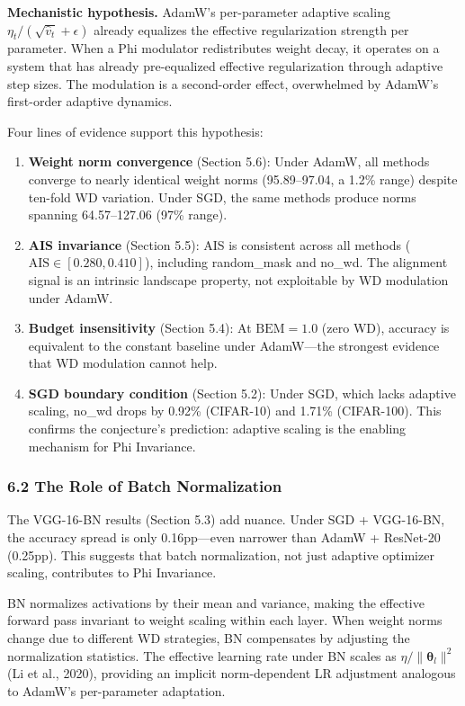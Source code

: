 \documentclass[
]{article}
\begin{document}
\textbf{Mechanistic hypothesis.} AdamW's per-parameter adaptive scaling
\(\eta_t / (\sqrt{\hat{v}_t} + \epsilon)\) already equalizes the
effective regularization strength per parameter. When a Phi modulator
redistributes weight decay, it operates on a system that has already
pre-equalized effective regularization through adaptive step sizes. The
modulation is a second-order effect, overwhelmed by AdamW's first-order
adaptive dynamics.

Four lines of evidence support this hypothesis:

\begin{enumerate}
\def\labelenumi{\arabic{enumi}.}
\item
  \textbf{Weight norm convergence} (Section 5.6): Under AdamW, all
  methods converge to nearly identical weight norms (95.89--97.04, a
  1.2\% range) despite ten-fold WD variation. Under SGD, the same
  methods produce norms spanning 64.57--127.06 (97\% range).
\item
  \textbf{AIS invariance} (Section 5.5): AIS is consistent across all
  methods (\(\mathrm{AIS} \in [0.280, 0.410]\)), including random\_mask
  and no\_wd. The alignment signal is an intrinsic landscape property,
  not exploitable by WD modulation under AdamW.
\item
  \textbf{Budget insensitivity} (Section 5.4): At \(\mathrm{BEM} = 1.0\)
  (zero WD), accuracy is equivalent to the constant baseline under
  AdamW---the strongest evidence that WD modulation cannot help.
\item
  \textbf{SGD boundary condition} (Section 5.2): Under SGD, which lacks
  adaptive scaling, no\_wd drops by 0.92\% (CIFAR-10) and 1.71\%
  (CIFAR-100). This confirms the conjecture's prediction: adaptive
  scaling is the enabling mechanism for Phi Invariance.
\end{enumerate}

\hypertarget{the-role-of-batch-normalization}{%
\subsubsection{6.2 The Role of Batch
Normalization}\label{the-role-of-batch-normalization}}

The VGG-16-BN results (Section 5.3) add nuance. Under SGD + VGG-16-BN,
the accuracy spread is only 0.16pp---even narrower than AdamW +
ResNet-20 (0.25pp). This suggests that batch normalization, not just
adaptive optimizer scaling, contributes to Phi Invariance.

BN normalizes activations by their mean and variance, making the
effective forward pass invariant to weight scaling within each layer.
When weight norms change due to different WD strategies, BN compensates
by adjusting the normalization statistics. The effective learning rate
under BN scales as \(\eta / \|\boldsymbol{\theta}_l\|^2\) (Li et al.,
2020), providing an implicit norm-dependent LR adjustment analogous to
AdamW's per-parameter adaptation.
\end{document}
